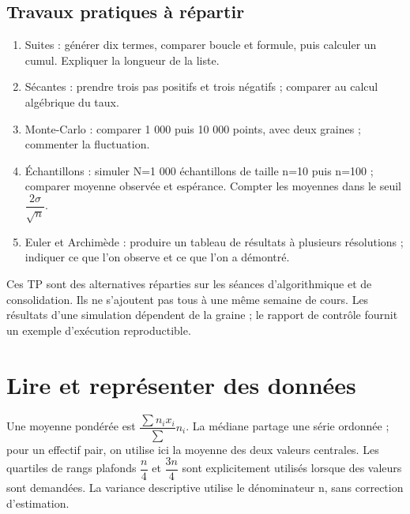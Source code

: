 \subsection*{Travaux pratiques à répartir}\label{TP}
\begin{enumerate}
\item Suites : générer dix termes, comparer boucle et formule, puis calculer un cumul. Expliquer la longueur de la liste.
\item Sécantes : prendre trois pas positifs et trois négatifs ; comparer au calcul algébrique du taux.
\item Monte-Carlo : comparer 1 000 puis 10 000 points, avec deux graines ; commenter la fluctuation.
\item Échantillons : simuler N=1 000 échantillons de taille n=10 puis n=100 ; comparer moyenne observée et espérance. Compter les moyennes dans le seuil $\dfrac{2\sigma}{\sqrt n}$.
\item Euler et Archimède : produire un tableau de résultats à plusieurs résolutions ; indiquer ce que l’on observe et ce que l’on a démontré.
\end{enumerate}
Ces TP sont des alternatives réparties sur les séances d’algorithmique et de consolidation. Ils ne s’ajoutent pas tous à une même semaine de cours. Les résultats d’une simulation dépendent de la graine ; le rapport de contrôle fournit un exemple d’exécution reproductible.

\section{Lire et représenter des données}\label{STATS}
Une moyenne pondérée est $\dfrac{\sum n_ix_i}{\sum}n_i$. La médiane partage une série ordonnée ; pour un effectif pair, on utilise ici la moyenne des deux valeurs centrales. Les quartiles de rangs plafonds $\dfrac{n}{4}$ et $\dfrac{3n}{4}$ sont explicitement utilisés lorsque des valeurs sont demandées. La variance descriptive utilise le dénominateur n, sans correction d’estimation.

